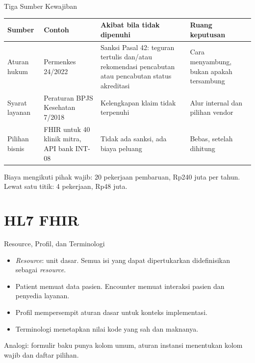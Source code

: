 \documentclass[aspectratio=169, table, 12pt]{beamer}
\begin{document}
\begin{frame}{{\Large Tiga Sumber Kewajiban}}
  \footnotesize
  \begin{tabularx}{\textwidth}{>{\raggedright\arraybackslash}p{2.1cm}
      >{\raggedright\arraybackslash}X >{\raggedright\arraybackslash}X >{\raggedright\arraybackslash}X}
    \hline
    \textbf{Sumber} & \textbf{Contoh} & \textbf{Akibat bila tidak dipenuhi} & \textbf{Ruang keputusan} \\ \hline
    Aturan hukum & Permenkes 24/2022 & Sanksi Pasal 42: teguran tertulis dan/atau rekomendasi pencabutan atau pencabutan status akreditasi & Cara menyambung, bukan apakah tersambung \\ \hline
    Syarat layanan & Peraturan BPJS Kesehatan 7/2018 & Kelengkapan klaim tidak terpenuhi & Alur internal dan pilihan vendor \\ \hline
    Pilihan bisnis & FHIR untuk 40 klinik mitra, API bank INT-08 & Tidak ada sanksi, ada biaya peluang & Bebas, setelah dihitung \\ \hline
  \end{tabularx}

  \vspace{8pt}
  \small Biaya mengikuti pihak wajib: 20 pekerjaan pembaruan, Rp240 juta per tahun. Lewat satu titik: 4 pekerjaan, Rp48 juta.
\end{frame}

\section{HL7 FHIR}

\begin{frame}{{\Large Resource, Profil, dan Terminologi}}
  \vspace{8pt}
  \begin{itemize}
    \item \textit{Resource}: unit dasar. Semua isi yang dapat dipertukarkan didefinisikan sebagai \textit{resource}.
    \item Patient memuat data pasien. Encounter memuat interaksi pasien dan penyedia layanan.
    \item Profil mempersempit aturan dasar untuk konteks implementasi.
    \item Terminologi menetapkan nilai kode yang sah dan maknanya.
  \end{itemize}
  \vspace{6pt}
  {\small Analogi: formulir baku punya kolom umum, aturan instansi menentukan kolom wajib dan daftar pilihan.}
\end{frame}
\end{document}
